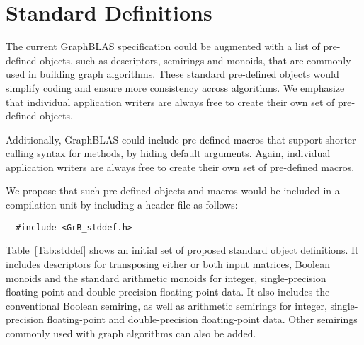 \section{Standard Definitions}
\label{Sec:stddef}

\newcommand{\integer}{{\sf int32\_t}}
\newcommand{\float}{{\sf float}}
\newcommand{\double}{{\sf double}}
\newcommand{\bool}{{\sf bool}}
\newcommand{\false}{{\sf false}}
\newcommand{\true}{{\sf true}}

The current GraphBLAS specification could be augmented with a list of 
pre-defined objects, such as descriptors, semirings and monoids, that are commonly used
in building graph algorithms. These standard pre-defined objects would
simplify coding and ensure more consistency across algorithms. 
We emphasize
that individual application writers are always free to create their own set of
pre-defined objects.

Additionally, GraphBLAS could include pre-defined macros that support
shorter calling syntax for methods, by hiding default arguments. 
Again, individual application writers are always free to create their
own set of pre-defined macros.

We propose that such pre-defined objects and macros would
be included in a compilation unit by including a header file as follows:

\begin{verbatim}
  #include <GrB_stddef.h>
\end{verbatim}

Table~\ref{Tab:stddef} shows an initial set of proposed standard object
definitions.  It includes descriptors for transposing either or both input
matrices, Boolean monoids and the standard arithmetic monoids for integer,
single-precision floating-point and double-precision floating-point
data.  It also includes the conventional Boolean semiring, as well as
arithmetic semirings for integer, single-precision floating-point and
double-precision floating-point data.  Other semirings commonly used
with graph algorithms can also be added.

